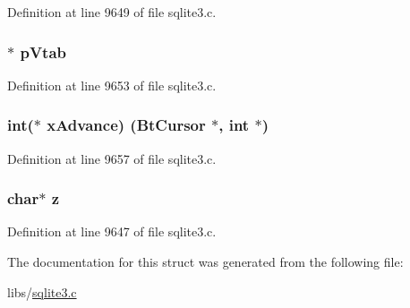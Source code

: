 Definition at line 9649 of file sqlite3.\+c.

\hypertarget{struct_vdbe_op_ac419881f4d817f9a40325e751a0a0469}{}
\subsubsection[{p\+Vtab}]{$\ast$ p\+Vtab}\label{struct_vdbe_op_ac419881f4d817f9a40325e751a0a0469}


Definition at line 9653 of file sqlite3.\+c.

\hypertarget{struct_vdbe_op_aa51062f00c915bc5cea5870763948c31}{}
\subsubsection[{x\+Advance}]{\setlength{\rightskip}{0pt plus 5cm}int($\ast$ x\+Advance) ({\bf Bt\+Cursor} $\ast$, int $\ast$)}\label{struct_vdbe_op_aa51062f00c915bc5cea5870763948c31}


Definition at line 9657 of file sqlite3.\+c.

\hypertarget{struct_vdbe_op_a99c0cc44b073a87d419d090571f773a5}{}
\subsubsection[{z}]{\setlength{\rightskip}{0pt plus 5cm}char$\ast$ z}\label{struct_vdbe_op_a99c0cc44b073a87d419d090571f773a5}


Definition at line 9647 of file sqlite3.\+c.



The documentation for this struct was generated from the following file\+:\begin{DoxyCompactItemize}
\item 
libs/\hyperlink{sqlite3_8c}{sqlite3.\+c}\end{DoxyCompactItemize}
